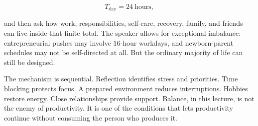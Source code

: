 \begin{equation}
T_{\mathrm{day}} = 24\ \mathrm{hours},
\end{equation}

and then ask how work, responsibilities, self-care, recovery, family, and friends can live inside that finite total. The speaker allows for exceptional imbalance: entrepreneurial pushes may involve \(16\)-hour workdays, and newborn-parent schedules may not be self-directed at all. But the ordinary majority of life can still be designed.

The mechanism is sequential. Reflection identifies stress and priorities. Time blocking protects focus. A prepared environment reduces interruptions. Hobbies restore energy. Close relationships provide support. Balance, in this lecture, is not the enemy of productivity. It is one of the conditions that lets productivity continue without consuming the person who produces it.